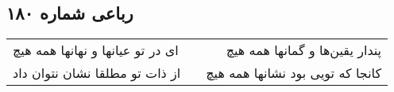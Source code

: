 \begin{center}
\section*{رباعی شماره ۱۸۰}
\label{sec:sh180}
\begin{longtable}{l p{0.5cm} r}
ای در تو عیانها و نهانها همه هیچ
&&
پندار یقین‌ها و گمانها همه هیچ
\\
از ذات تو مطلقا نشان نتوان داد
&&
کانجا که تویی بود نشانها همه هیچ
\\
\end{longtable}
\end{center}
